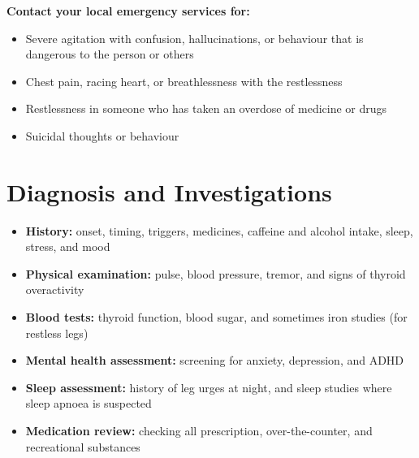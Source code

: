 \textbf{Contact your local emergency services for:}
\begin{itemize}
    \item Severe agitation with confusion, hallucinations, or behaviour that is dangerous to the person or others
    \item Chest pain, racing heart, or breathlessness with the restlessness
    \item Restlessness in someone who has taken an overdose of medicine or drugs
    \item Suicidal thoughts or behaviour
\end{itemize}

\section*{Diagnosis and Investigations}
\begin{itemize}
    \item \textbf{History:} onset, timing, triggers, medicines, caffeine and alcohol intake, sleep, stress, and mood
    \item \textbf{Physical examination:} pulse, blood pressure, tremor, and signs of thyroid overactivity
    \item \textbf{Blood tests:} thyroid function, blood sugar, and sometimes iron studies (for restless legs)
    \item \textbf{Mental health assessment:} screening for anxiety, depression, and ADHD
    \item \textbf{Sleep assessment:} history of leg urges at night, and sleep studies where sleep apnoea is suspected
    \item \textbf{Medication review:} checking all prescription, over-the-counter, and recreational substances
\end{itemize}

